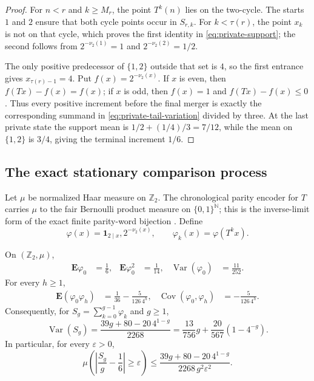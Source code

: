 \begin{proof}
For $n<r$ and $k\ge M_r$, the point $T^k(n)$ lies on the two-cycle.  The
starts $1$ and $2$ ensure that both cycle points occur in $S_{r,k}$.  For
$k<\tau(r)$, the point $x_k$ is not on that cycle, which proves the first
identity in \eqref{eq:private-support}; the second follows from
$2^{-\nu_2(1)}=1$ and $2^{-\nu_2(2)}=1/2$.

The only positive predecessor of $\{1,2\}$ outside that set is $4$, so the
first entrance gives $x_{\tau(r)-1}=4$.  Put $f(x)=2^{-\nu_2(x)}$.  If $x$
is even, then $f(Tx)-f(x)=f(x)$; if $x$ is odd, then $f(x)=1$ and
$f(Tx)-f(x)\le0$.  Thus every positive increment before the final merger is
exactly the corresponding summand in \eqref{eq:private-tail-variation}
divided by three.  At the last private state the support mean is
$1/2+(1/4)/3=7/12$, while the mean on $\{1,2\}$ is $3/4$, giving the terminal
increment $1/6$.
\end{proof}

\subsection{The exact stationary comparison process}

Let $\mu$ be normalized Haar measure on $\mathbb Z_2$.  The chronological
parity encoder for $T$ carries $\mu$ to the fair Bernoulli product measure on
$\{0,1\}^{\mathbb N}$; this is the inverse-limit form of the exact finite
parity-word bijection \cite[Theorems~1.1--1.2]{Terras1976}.  Define
\begin{equation}
 \varphi(x)=\mathbf 1_{2\mid x},2^{-\nu_2(x)},
 \qquad \varphi_k(x)=\varphi(T^kx).
 \label{eq:haar-observable}
\end{equation}

\begin{theorem}
\label{thm:record-tail-haar-covariance}
On $(\mathbb Z_2,\mu)$,
\begin{align}
 \mathbf E\varphi_0&=\frac16,&
 \mathbf E\varphi_0^2&=\frac1{14},&
 \operatorname{Var}(\varphi_0)&=\frac{11}{252}.
 \label{eq:phi-one-point-moments}
\end{align}
For every $h\ge1$,
\begin{align}
 \mathbf E(\varphi_0\varphi_h)
  &=\frac1{36}-\frac5{126\,4^h},&
 \operatorname{Cov}(\varphi_0,\varphi_h)
  &=-\frac5{126\,4^h}.
 \label{eq:phi-covariance}
\end{align}
Consequently, for $S_g=\sum_{k=0}^{g-1}\varphi_k$ and $g\ge1$,
\begin{equation}
 \operatorname{Var}(S_g)
 =\frac{39g+80-20\,4^{1-g}}{2268}
 =\frac{13}{756}g+\frac{20}{567}(1-4^{-g}).
 \label{eq:finite-haar-variance}
\end{equation}
In particular, for every $\varepsilon>0$,
\begin{equation}
 \mu\left(\left|\frac{S_g}{g}-\frac16\right|\ge\varepsilon\right)
 \le
 \frac{39g+80-20\,4^{1-g}}
      {2268\,g^2\varepsilon^2}.
 \label{eq:haar-chebyshev}
\end{equation}
\end{theorem}

